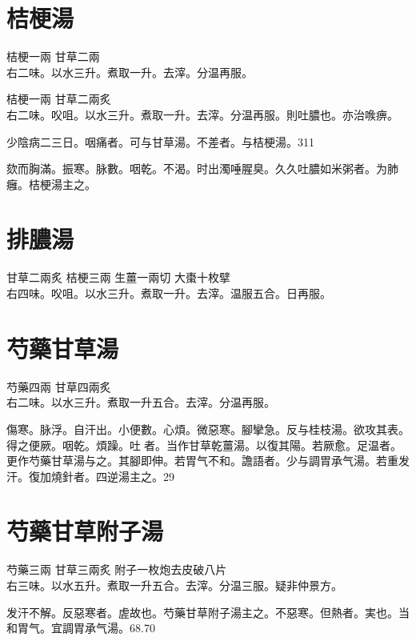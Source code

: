 \section{桔梗湯}

桔梗{\scriptsize 一兩} 甘草{\scriptsize 二兩}\\
右二味。以水三升。煮取一升。去滓。分温再服。

桔梗{\scriptsize 一兩} 甘草{\scriptsize 二兩炙}\\
右二味。㕮咀。以水三升。煮取一升。去滓。分温再服。則吐膿也。{\scriptsize 亦治㗋痹。}{\wuben}

少陰病二三日。咽痛者。可与甘草湯。不差者。与桔梗湯。311

欬而胸滿。振寒。脉數。咽乾。不渴。时出濁唾腥臭。久久吐膿如米粥者。为肺癰。桔梗湯主之。

\section{排膿湯}

甘草{\scriptsize 二兩炙} 桔梗{\scriptsize 三兩} 生薑{\scriptsize 一兩切} 大棗{\scriptsize 十枚擘}\\
右四味。㕮咀。以水三升。煮取一升。去滓。温服五合。日再服。

\section{芍藥甘草湯}

芍藥{\scriptsize 四兩} 甘草{\scriptsize 四兩炙}\\
右二味。以水三升。煮取一升五合。去滓。分温再服。

傷寒。脉浮。自汗出。小便數。心煩。微惡寒。腳攣急。反与桂枝湯。欲攻其表。得之便厥。咽乾。煩躁。吐{\sungii 𠱘}者。当作甘草乾薑湯。以復其陽。若厥愈。足温者。更作芍藥甘草湯与之。其腳即伸。若胃气不和。譫語者。少与{\khaai 調胃}承气湯。若重发汗。復加燒針者。四逆湯主之。29

\section{芍藥甘草附子湯}

芍藥{\scriptsize 三兩} 甘草{\scriptsize 三兩炙} 附子{\scriptsize 一枚炮去皮破八片}\\
右三味。以水五升。煮取一升五合。去滓。分温三服。疑非仲景方。

发汗不解。反惡寒者。虗故也。芍藥甘草附子湯主之。不惡寒。但熱者。実也。当和胃气。宜調胃承气湯。68.70

